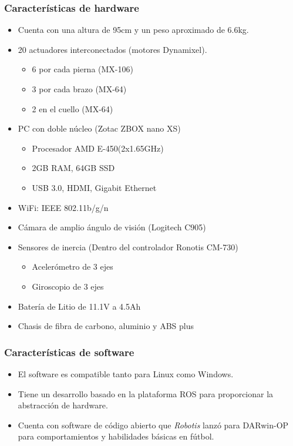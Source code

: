 	\subsubsection*{Características de hardware}
	\begin{itemize}
	\item Cuenta con una altura de 95cm y un peso aproximado de 6.6kg.
	\item 20 actuadores interconectados (motores Dynamixel).
		\begin{itemize}
			\item 6 por cada pierna (MX-106)
			\item 3 por cada brazo (MX-64)
			\item 2 en el cuello (MX-64)
		\end{itemize}
	\item PC con doble núcleo (Zotac ZBOX nano XS)
		\begin{itemize}
		\item Procesador AMD E-450(2x1.65GHz) 
		\item 2GB RAM, 64GB SSD
		\item USB 3.0, HDMI, Gigabit Ethernet
		\end{itemize}
	\item WiFi: IEEE 802.11b/g/n
	\item Cámara de amplio ángulo de visión (Logitech C905)
	\item Sensores de inercia (Dentro del controlador Ronotis CM-730)
		\begin{itemize}
		\item Acelerómetro de 3 ejes
		\item Giroscopio de 3 ejes
		\end{itemize}
	\item Batería de Litio de 11.1V a 4.5Ah
	\item Chasis de fibra de carbono, aluminio y ABS plus
	\end{itemize}
	
	\subsubsection*{Características de software}
	\begin{itemize}
	\item El software es compatible tanto para Linux como Windows.
	\item Tiene un desarrollo basado en la plataforma ROS para proporcionar la abstracción de hardware.
	\item Cuenta con software de código abierto que \textit{Robotis} lanzó para DARwin-OP para comportamientos y habilidades básicas en fútbol.
	\end{itemize}
	
